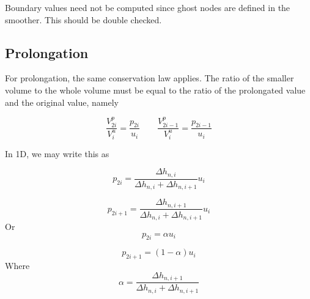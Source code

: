 \documentclass[11pt]{article}
\begin{document}
Boundary values need not be computed since ghost nodes are defined in the smoother. This should be double checked.

\subsection{Prolongation}

For prolongation, the same conservation law applies. The ratio of the smaller volume to the whole volume must be equal to the ratio of the prolongated value and the original value, namely

\begin{equation}
	\frac{V_{2i}^{p}}{V_{i}^{u}} = \frac{p_{2i}}{u_{i}} \qquad 
	\frac{V_{2i-1}^{p}}{V_{i}^{u}} = \frac{p_{2i-1}}{u_{i}}
\end{equation}

In 1D, we may write this as

\begin{equation}
	p_{2i} = \frac{\Delta h_{n,i}}{\Delta h_{n,i} + \Delta h_{n,i+1}} u_i
\end{equation}

\begin{equation}
	p_{2i+1} = \frac{\Delta h_{n,i+1}}{\Delta h_{n,i} + \Delta h_{n,i+1}} u_i
\end{equation}
Or
\begin{equation}
	p_{2i} = \alpha u_i
\end{equation}

\begin{equation}
	p_{2i+1} = (1-\alpha) u_i
\end{equation}
Where
\begin{equation}
	\alpha = \frac{\Delta h_{n,i+1}}{\Delta h_{n,i} + \Delta h_{n,i+1}}
\end{equation}
\end{document}
